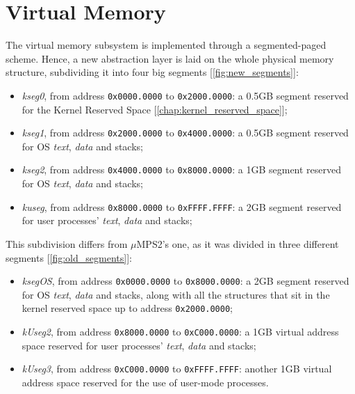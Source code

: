 \documentclass[12pt,a4paper,openright,twoside]{report}
\begin{document}
\section{Virtual Memory}
The virtual memory subsystem is implemented through a segmented-paged scheme.
Hence, a new abstraction layer is laid on the whole physical memory structure, subdividing it into four big segments [\autoref{fig:new_segments}]:
\begin{itemize}
	\item \textit{kseg0}, from address \texttt{0x0000.0000} to \texttt{0x2000.0000}: a 0.5GB segment reserved for the Kernel Reserved Space [\autoref{chap:kernel_reserved_space}];
	\item \textit{kseg1}, from address \texttt{0x2000.0000} to \texttt{0x4000.0000}: a 0.5GB segment reserved for OS \textit{text}, \textit{data} and stacks;
	\item \textit{kseg2}, from address \texttt{0x4000.0000} to \texttt{0x8000.0000}: a 1GB segment reserved for OS \textit{text}, \textit{data} and stacks;
	\item \textit{kuseg}, from address \texttt{0x8000.0000} to \texttt{0xFFFF.FFFF}: a 2GB segment reserved for user processes' \textit{text}, \textit{data} and stacks;
\end{itemize}
This subdivision differs from $\mu$MPS2's one, as it was divided in three different segments [\autoref{fig:old_segments}]:
\begin{itemize}
	\item \textit{ksegOS}, from address \texttt{0x0000.0000} to \texttt{0x8000.0000}: a 2GB segment reserved for OS \textit{text}, \textit{data} and stacks, along with all the structures that sit in the kernel reserved space up to address \texttt{0x2000.0000};
	\item \textit{kUseg2}, from address \texttt{0x8000.0000} to \texttt{0xC000.0000}: a 1GB virtual address space reserved for user processes' \textit{text}, \textit{data} and stacks;
	\item \textit{kUseg3}, from address \texttt{0xC000.0000} to \texttt{0xFFFF.FFFF}: another 1GB virtual address space reserved for the use of user-mode processes.
\end{itemize}
\end{document}
